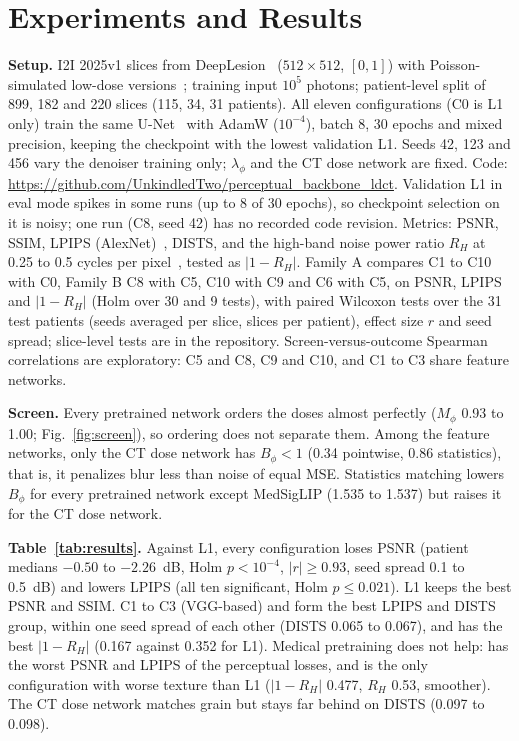 \section{Experiments and Results}
\label{sec:experiments}

\textbf{Setup.} I2I 2025v1 slices from DeepLesion~\cite{yan2018deeplesion} ($512 \times 512$, $[0, 1]$) with
Poisson-simulated low-dose versions~\cite{leuschner2021lodopab}; training input $10^5$ photons; patient-level split of 899, 182 and 220
slices (115, 34, 31 patients). All eleven configurations (C0 is L1 only) train the same U-Net~\cite{ronneberger2015unet}
with AdamW ($10^{-4}$), batch 8, 30 epochs and mixed precision, keeping the checkpoint with the lowest validation L1.
Seeds 42, 123 and 456 vary the denoiser training only; $\lambda_\phi$ and the CT dose network are fixed. Code:
\url{https://github.com/UnkindledTwo/perceptual_backbone_ldct}.
Validation L1 in eval mode spikes in some runs (up to 8 of 30 epochs), so checkpoint selection on it is noisy;
one run (C8, seed 42) has no recorded code revision. Metrics: PSNR, SSIM, LPIPS (AlexNet)~\cite{zhang2018lpips},
DISTS, and the high-band noise power ratio $R_H$ at 0.25 to 0.5 cycles per pixel~\cite{samei2019tg233}, tested as
$\lvert 1 - R_H \rvert$. Family A compares C1 to C10 with C0, Family B C8 with C5, C10 with C9 and C6 with C5, on
PSNR, LPIPS and $\lvert 1 - R_H \rvert$ (Holm over 30 and 9 tests), with paired Wilcoxon tests over the 31 test
patients (seeds averaged per slice, slices per patient), effect size $r$ and seed spread; slice-level tests are in the
repository. Screen-versus-outcome Spearman correlations are exploratory: C5 and C8, C9 and C10, and C1 to C3 share
feature networks.

\textbf{Screen.} Every pretrained network orders the doses almost perfectly ($M_\phi$ 0.93 to 1.00;
Fig.~\ref{fig:screen}), so ordering does not separate them. Among the feature networks, only the CT dose network has
$B_\phi < 1$ (0.34 pointwise, 0.86 statistics), that is, it penalizes blur less than noise of equal MSE. Statistics
matching lowers $B_\phi$ for every pretrained network except MedSigLIP (1.535 to 1.537) but raises it for the CT dose
network.

\textbf{Table~\ref{tab:results}.} Against L1, every configuration loses PSNR (patient medians $-0.50$ to
$-2.26$~dB, Holm $p < 10^{-4}$, $\lvert r \rvert \geq 0.93$, seed spread 0.1 to 0.5~dB) and lowers LPIPS (all ten
significant, Holm $p \leq 0.021$). L1 keeps the best PSNR and SSIM. C1 to C3 (VGG-based) and
 form the best LPIPS and DISTS group, within one seed spread of each other (DISTS 0.065
to 0.067), and  has the best $\lvert 1 - R_H \rvert$ (0.167 against 0.352 for
L1). Medical pretraining does not help:  has the worst PSNR and LPIPS of the
perceptual losses, and  is the only configuration with worse texture than L1
($\lvert 1 - R_H \rvert$ 0.477, $R_H$ 0.53, smoother). The CT dose network matches grain but stays far behind on DISTS
(0.097 to 0.098).

